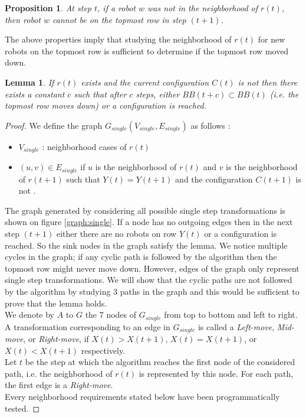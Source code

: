 \documentclass[11pt, a4paper]{article}
\theoremstyle{plain}
\newtheorem{lem}[thm]{Lemma}
\newtheorem{prop}[thm]{Proposition}
\theoremstyle{definition}
\theoremstyle{remark}
\begin{document}
\begin{prop}
At step $t$, if a robot $w$ was not in the neighborhood of $r(t)$, then robot
$w$ cannot be on the topmost row in step $(t+1)$.  \end{prop}

The above properties imply that studying the neighborhood of $r(t)$ for new
robots on the topmost row is sufficient to determine if the topmost row moved
down.

\begin{lem}
If $r(t)$ exists and the current configuration $C(t)$ is not  \Gathered then
there exists a constant $c$ such that after $c$ steps, either $BB(t+c) \subset
BB(t)$ (i.e. the topmost row moves down) or a \Gathered configuration is
reached.
\end{lem}

\begin{proof}

We define the graph $G_{single}(V_{single}, E_{single})$ as follows :
\begin{itemize}
  \item $V_{single}$ : neighborhood cases of $r(t)$
  \item $(u,v) \in E_{single}$ if $u$ is the neighborhood of $r(t)$ and $v$ is
        the neighborhood of $r(t+1)$ such that $Y(t)=Y(t+1)$ and the
        configuration $C(t+1)$ is not \Gathered.  \end{itemize}
The graph generated by considering all possible single step transformations is
shown on figure \ref{graph:single}. If a node has no outgoing edges then in the
next step $(t+1)$ either there are no robots on row $Y(t)$ or a \Gathered
configuration is reached. So the sink nodes in the graph satisfy the lemma.  We
notice multiple cycles in the graph; if any cyclic path is followed by the
algorithm then the topmost row might never move down. However, edges of the
graph only represent single step transformations. We will show that the cyclic
paths are not followed by the algorithm by studying 3 paths in the graph and
this would be sufficient to prove that the lemma holds. \\

\noindent
We denote by $A$ to $G$ the 7 nodes of $G_{single}$ from top to
bottom and left to right. \\ A transformation corresponding to an edge in
$G_{single}$ is called a \emph{Left-move}, \emph{Mid-move}, or
\emph{Right-move}, if  $X(t) > X(t+1)$, $X(t) = X(t+1)$, or $X(t) < X(t+1)$
respectively.\\
Let $t$ be the step at which the algorithm reaches the first node of the
considered path, i.e. the neighborhood of $r(t)$ is represented by this node.
For each path, the first edge is a \emph{Right-move}. \\
Every neighborhood requirements stated below have been programmatically tested.


\end{proof}
\end{document}
